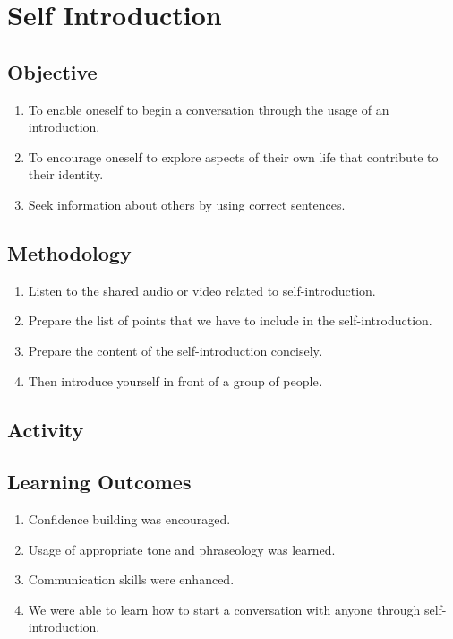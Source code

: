\section{Self Introduction}

\subsection{Objective}

\begin{enumerate}
    \item To enable oneself to begin a conversation through the usage of an introduction.
    \item To encourage oneself to explore aspects of their own life that contribute to their identity.
    \item Seek information about others by using correct sentences.

\end{enumerate}

\subsection{Methodology}

\begin{enumerate}
    \item Listen to the shared audio or video related to self-introduction.
    \item Prepare the list of points that we have to include in the self-introduction.
    \item Prepare the content of the self-introduction concisely.
    \item Then introduce yourself in front of a group of people.
\end{enumerate}

\subsection{Activity}

\subsection{Learning Outcomes}

\begin{enumerate}
    \item Confidence building was encouraged.
    \item Usage of appropriate tone and phraseology was learned.
    \item Communication skills were enhanced.
    \item We were able to learn how to start a conversation with anyone through self-introduction.
\end{enumerate}

